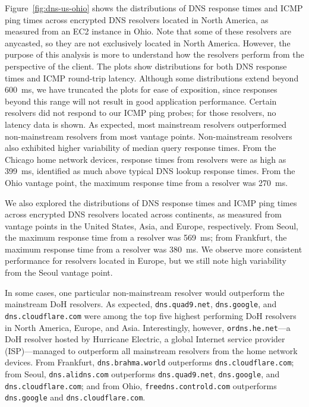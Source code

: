 Figure~\ref{fig:dns-us-ohio} shows the distributions of DNS response times and
ICMP ping times across encrypted DNS resolvers located in North America, as
measured from an EC2 instance in Ohio. Note that some of these resolvers are anycasted,
so they are not exclusively located in North America. However, the purpose of this analysis
is more to understand how the resolvers perform from the perspective of the client.
The plots show distributions for both DNS response times and ICMP round-trip latency.  Although some distributions
extend beyond 600~ms, we have truncated the plots for ease of exposition,
since responses beyond this range will not result in good application
performance.  Certain resolvers did not respond to our ICMP ping probes; for
those resolvers, no latency data is shown.
As expected, most mainstream resolvers outperformed non-mainstream resolvers
from most vantage points.  Non-mainstream resolvers also exhibited higher
variability of median query response times.  
From the Chicago home network devices, response times from resolvers were as
high as 399~ms, identified as much above typical DNS lookup response times.
From the Ohio vantage point, the maximum response time from a resolver was 270~ms. 

We also explored the distributions of DNS response times and ICMP ping times
across encrypted DNS resolvers located across continents, as measured from
vantage points in the United States, Asia, and Europe, respectively.  From
Seoul, the maximum response time from a resolver was 569~ms; from Frankfurt,
the maximum response time from a resolver was 380~ms.  We observe more
consistent performance for resolvers located in Europe, but we still note high
variability from the Seoul vantage point.

In some cases, one particular non-mainstream resolver would outperform
the mainstream DoH resolvers.  As expected, \texttt{dns.quad9.net},
\texttt{dns.google}, and \texttt{dns.cloudflare.com} were among the top five
highest performing DoH resolvers in North America, Europe, and Asia.
Interestingly, however, \texttt{ordns.he.net}---a DoH resolver hosted by
Hurricane Electric, a global Internet service provider (ISP)---managed to
outperform all mainstream resolvers from the home network devices. From Frankfurt, \texttt{dns.brahma.world}
outperforms \texttt{dns.cloudflare.com}; from Seoul, \texttt{dns.alidns.com} outperforms \texttt{dns.quad9.net},
\texttt{dns.google}, and \texttt{dns.cloudflare.com}; and from Ohio, \texttt{freedns.controld.com} outperforms \texttt{dns.google}
and \texttt{dns.cloudflare.com}.

